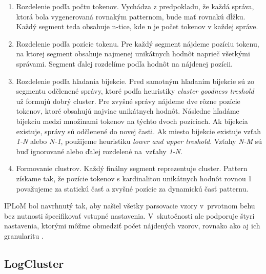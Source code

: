 \begin{enumerate}
  \item Rozdelenie podľa počtu tokenov. Vychádza z predpokladu, že každá správa, ktorá bola vygenerovaná rovnakým patternom, bude mať rovnakú dĺžku. Každý segment teda obsahuje n-tice, kde n je počet tokenov v každej správe.
  \item Rozdelenie podľa pozície tokenu. Pre každý segment nájdeme pozíciu tokenu, na ktorej segment obsahuje najmenej unikátnych hodnôt naprieč všetkými správami. Segment ďalej rozdelíme podľa hodnôt na nájdenej pozícii.
  \item Rozdelenie podľa hľadania bijekcie. Pred samotným hľadaním bijekcie sú zo segmentu odčlenené správy, ktoré podľa heuristiky \emph{cluster goodness treshold} už formujú dobrý cluster. Pre zvyšné správy nájdeme dve rôzne pozície tokenov, ktoré obsahujú naj\-viac unikátnych hodnôt. Následne hľadáme bijekciu medzi mno\-žinami tokenov na týchto dvoch pozíciach. Ak bijekcia existuje, správy sú odčlenené do novej časti. Ak miesto bijekcie existuje vzťah \emph{1-N} alebo \emph{N-1}, použijeme heuristiku \emph{lower and upper treshold}. Vzťahy \emph{N-M} sú buď ignorované alebo ďalej rozdelené na~vzťahy \emph{1-N}.
  \item Formovanie clustrov. Každý finálny segment reprezentuje cluster. Pattern získame tak, že pozície tokenov s kardinalitou unikátnych hodnôt rovnou 1 považujeme za statickú časť a zvyšné pozície za dynamickú časť patternu.
\end{enumerate}

IPLoM bol navrhnutý tak, aby našiel všetky parsovacie vzory v~prvotnom behu bez nutnosti špecifikovať vstupné nastavenia. V~skutočnosti ale podporuje štyri nastavenia, ktorými môžme obmedziť počet nájdených vzorov, rovnako ako aj ich granularitu \parencite{nagappanvouk}.

\subsection{LogCluster}

